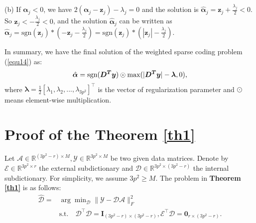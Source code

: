 (b) If $\bm{\alpha}_{j}< 0$, we have
$
2(\bm{\alpha}_{j}-\bm{z}_{j})-\lambda_{j}=0
$
and the solution is
$
\hat{\bm{\alpha}}_{j}=\bm{z}_{j}+\frac{\lambda_{j}}{2} < 0.
$
So $\bm{z}_{j}<-\frac{\lambda_{j}}{2}< 0$, and the solution $\hat{\bm{\alpha}}_{j}$ can be written as
$
\hat{\bm{\alpha}}_{j}=\text{sgn}(\bm{z}_{j})*(-\bm{z}_{j}-\frac{\lambda_{j}}{2})=\text{sgn}(\bm{z}_{j})*(|\bm{z}_{j}|-\frac{\lambda_{j}}{2}).
$

In summary, we have the final solution of the weighted sparse coding problem (\ref{equ14}) as:
\vspace{-1mm}
\begin{equation}\label{equ18}\vspace{-1mm}
\hat{\bm{\alpha}}= \text{sgn}(\bm{D^{T}y})\odot \text{max}(|\bm{D^{T}y}|-\bm{\lambda},0),
\end{equation}
where $\bm{\lambda} = \frac{1}{2}[\lambda_{1},\lambda_{2},...,\lambda_{3p^2}]^{\top}$ is the vector of regularization parameter and $\odot$ means element-wise multiplication.

\section{Proof of the Theorem \ref{th1}}

Let $\mathcal{A}\in \mathbb{R}^{(3p^2-r)\times M},\mathcal{Y}\in \mathbb{R}^{3p^2\times M}$ be two given data matrices. Denote by $\mathcal{E}\in\mathbb{R}^{3p^2\times r}$ the external subdictionary and $\mathcal{D}\in\mathbb{R}^{3p^2\times (3p^2-r)}$ the internal subdictionary. For simplicity, we assume $3p^2\ge M$. The problem in \textbf{Theorem \ref{th1}} is as follows:
\begin{equation}\label{equ19}
\begin{split}
\hat{\mathcal{D}}
=
&
\arg\min\nolimits_{\mathcal{D}}\|\mathcal{Y}-\mathcal{D}\mathcal{A}\|_{F}^{2}
\\
&
\text{s.t.}
\quad
\mathcal{D}^{\top}\mathcal{D} = \bm{I}_{(3p^2-r)\times (3p^2-r)}, \mathcal{E}^{\top}\mathcal{D} = \bm{0}_{r\times (3p^2-r)}.
\end{split}
\end{equation} 

